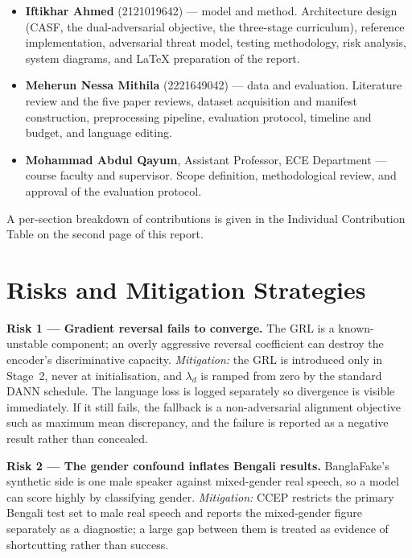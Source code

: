 \documentclass[conference]{IEEEtran}
\begin{document}
\begin{itemize}
\item \textbf{Iftikhar Ahmed} (2121019642) --- model and method. Architecture
      design (CASF, the dual-adversarial objective, the three-stage
      curriculum), reference implementation, adversarial threat model,
      testing methodology, risk analysis, system diagrams, and \LaTeX{}
      preparation of the report.
\item \textbf{Meherun Nessa Mithila} (2221649042) --- data and evaluation.
      Literature review and the five paper reviews, dataset acquisition and
      manifest construction, preprocessing pipeline, evaluation protocol,
      timeline and budget, and language editing.
\item \textbf{Mohammad Abdul Qayum}, Assistant Professor, ECE Department ---
      course faculty and supervisor. Scope definition, methodological review,
      and approval of the evaluation protocol.
\end{itemize}

A per-section breakdown of contributions is given in the Individual
Contribution Table on the second page of this report.

\section{Risks and Mitigation Strategies}

\textbf{Risk 1 --- Gradient reversal fails to converge.} The GRL is a
known-unstable component; an overly aggressive reversal coefficient can
destroy the encoder's discriminative capacity.
\emph{Mitigation:} the GRL is introduced only in Stage~2, never at
initialisation, and $\lambda_d$ is ramped from zero by the standard DANN
schedule. The language loss is logged separately so divergence is visible
immediately. If it still fails, the fallback is a non-adversarial alignment
objective such as maximum mean discrepancy, and the failure is reported as a
negative result rather than concealed.

\textbf{Risk 2 --- The gender confound inflates Bengali results.} BanglaFake's
synthetic side is one male speaker against mixed-gender real speech, so a
model can score highly by classifying gender.
\emph{Mitigation:} CCEP restricts the primary Bengali test set to male real
speech and reports the mixed-gender figure separately as a diagnostic; a
large gap between them is treated as evidence of shortcutting rather than
success.
\end{document}

